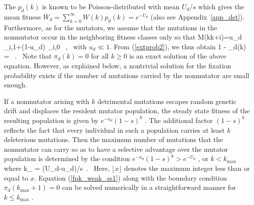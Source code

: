 \documentclass[preprint,12pt,number]{elsarticle}
\begin{document}
The  $p_d(k)$ is known to be Poisson-distributed  with mean $U_d/s$ \citep{Kimura:1966,Haigh:1978} which gives the mean fitness ${\overline W}_d=\sum_{k=0}^\infty W(k) p_d(k)=e^{-U_d}$ 
(also see Appendix~\ref{app_det}). Furthermore, as for the mutators, we assume that the mutations in the nonmutator occur in the neighboring fitness classes only so that 
\be
M(k\rightarrow k+i)=u_d \delta_{i,1}+(1-u_d) \delta_{i,0} ~,~
\label{M1}
\ee 
with $u_d \ll 1$. From (\ref{extprob2}), we thus obtain
\be
\label{fpk_weak_ss1}
1 - \pi_d(k) = \exp {} ~.~
\ee 
Note that $\pi_d(k)=0$ for all $k \geq 0$ is an exact solution of the above equation. 
However, as explained below, a nontrivial solution for the fixation probability exists if the number of mutations carried by the nonmutator are small enough. 

If a nonmutator arising with $k$ detrimental mutations escapes random genetic drift and displaces the resident mutator population, the steady state fitness of the resulting population is given by $e^{-u_d}(1-s)^k$ \citep{Haigh:1978}. The additional factor $(1-s)^k$ reflects the fact that every individual in such a population carries at least $k$ deleterious mutations. Then the maximum number of mutations that the nonmutator can carry 
so as to have a selective advantage over the mutator population is determined by the condition $e^{-u_d}(1-s)^k > e^{-U_d}$ \citep{Johnson:2002}, or $k < k_{\max}$ where 
\be
\label{kmax}
k_{\max} = \lfloor\left(U_d-u_d\right)/s\rfloor ~.~
\ee
Here, $\lfloor x \rfloor$ denotes the maximum integer less than or equal to $x$. Equation (\ref{fpk_weak_ss1}) along with the boundary condition $\pi_d(k_{\max}+1)=0$ can be solved numerically in a straightforward manner for $k \leq k_{\max}$  \citep{Johnson:2002}. 
\end{document}
